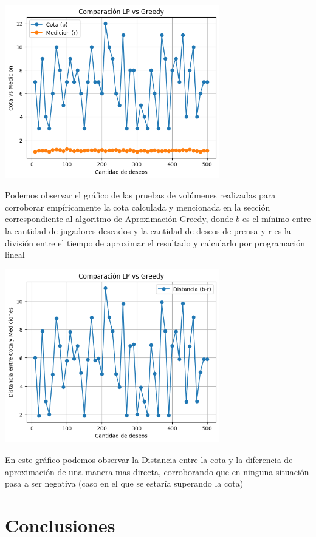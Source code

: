 \documentclass{estilo}
\begin{document}
\newpage
\begin{center}
\includegraphics[width=0.7\textwidth]{img/LPvsGreedy_cota1.png}

Podemos observar el gráfico de las pruebas de volúmenes realizadas para corroborar empíricamente la cota calculada y mencionada en la sección correspondiente al algoritmo de Aproximación Greedy, donde $b$ es el mínimo entre la cantidad de jugadores deseados y la cantidad de deseos de prensa y r es la división entre el tiempo de aproximar el resultado y calcularlo por programación lineal
\end{center}

\begin{center}
\includegraphics[width=0.7\textwidth]{img/LPvsGreedy_cota2.png}

En este gráfico podemos observar la Distancia entre la cota y la diferencia de aproximación de una manera mas directa, corroborando que en ninguna situación pasa a ser negativa (caso en el que se estaría superando la cota)
\end{center}

\newpage
\section{Conclusiones}
\end{document}
